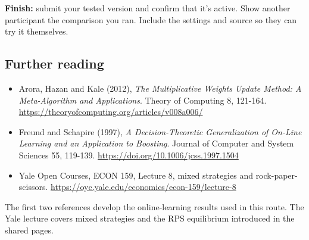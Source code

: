 \documentclass[11pt]{article}
\begin{document}
\begin{checkpoint}
\textbf{Finish:} submit your tested version and confirm that it's active. Show another participant the comparison you ran. Include the settings and source so they can try it themselves.
\end{checkpoint}

\subsection*{Further reading}

\begin{itemize}
\item Arora, Hazan and Kale (2012), \emph{The Multiplicative Weights Update Method: A Meta-Algorithm and Applications}. Theory of Computing 8, 121-164. \url{https://theoryofcomputing.org/articles/v008a006/}
\item Freund and Schapire (1997), \emph{A Decision-Theoretic Generalization of On-Line Learning and an Application to Boosting}. Journal of Computer and System Sciences 55, 119-139. \url{https://doi.org/10.1006/jcss.1997.1504}
\item Yale Open Courses, ECON 159, Lecture 8, mixed strategies and rock-paper-scissors. \url{https://oyc.yale.edu/economics/econ-159/lecture-8}
\end{itemize}

The first two references develop the online-learning results used in this route. The Yale lecture covers mixed strategies and the RPS equilibrium introduced in the shared pages.
\par
\end{document}
